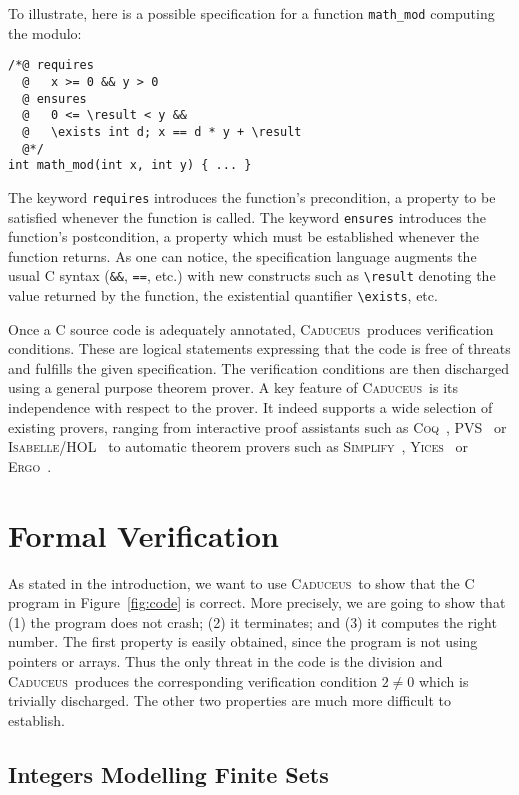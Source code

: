 \documentclass[a4paper]{llncs}
\newcommand{\caduceus}{\textsc{Caduceus}}
\newcommand{\simplify}{\textsc{Simplify}}
\newcommand{\ergo}{\textsc{Ergo}}
\newcommand{\yices}{\textsc{Yices}}
\newcommand{\coq}{\textsc{Coq}}
\begin{document}
To illustrate, here is a possible specification for a function
\texttt{math\_mod} computing the modulo:
\begin{verbatim}
/*@ requires 
  @   x >= 0 && y > 0
  @ ensures 
  @   0 <= \result < y &&
  @   \exists int d; x == d * y + \result
  @*/
int math_mod(int x, int y) { ... }
\end{verbatim}
The keyword \texttt{requires} introduces the function's precondition,
a property to be satisfied whenever the function is called.
The keyword \texttt{ensures} introduces the function's postcondition,
a property which must be established whenever the function returns.
As one can notice, the specification language augments the usual
C syntax (\verb!&&!, \verb!==!, etc.) with new constructs such as
\verb!\result! denoting the value returned by the function, the
existential quantifier \verb!\exists!, etc.

Once a C source code is adequately annotated, \caduceus\
produces verification conditions. These are logical statements
expressing that the code is free of threats and fulfills the given
specification. The verification conditions are then discharged using a
general purpose theorem prover. A key feature of \caduceus\ is
its independence with respect to the prover. It indeed supports a wide
selection of existing provers, ranging from interactive proof assistants
such as \coq~\cite{coq}, PVS~\cite{PVS} or
\textsc{Isabelle/HOL}~\cite{Isabelle} to 
automatic theorem provers such as 
\simplify~\cite{simplify}, \yices~\cite{yices} or \ergo~\cite{ergo}.


\section{Formal Verification}\label{verif}

As stated in the introduction, we want to use \caduceus\ to show that
the C program in 
Figure~\ref{fig:code} is correct. More precisely, we
are going to show that (1) the program does not crash; (2)
it terminates; and (3) it computes the right number.
The first property is easily obtained, since the program is not using
pointers or arrays. Thus the only threat in the code is the division and
\caduceus\ produces the corresponding verification condition $2\not=0$
which is trivially discharged. The other two properties are much more
difficult to establish.

\subsection{Integers Modelling Finite Sets}\label{setmodel}
\end{document}
